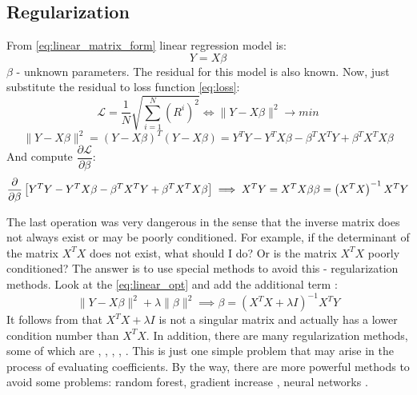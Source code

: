 \subsection{Regularization}
From \eqref{eq:linear_matrix_form} linear regression model is:
\begin{equation*}
	Y = X \beta
\end{equation*}
$\beta$ - unknown parameters. The residual for this model is also known. Now, just substitute the residual to loss function \eqref{eq:loss}:
\begin{equation*}
	\mathcal{L} = \dfrac{1}{N} \sqrt{\sum_{i = 1}^N \left ( R^i \right )^2} \Leftrightarrow \| Y - X \beta \|^2 \rightarrow min
\end{equation*}
\begin{equation}
	\| Y - X \beta \|^2 = \left ( Y - X \beta \right )^T \left ( Y - X \beta \right ) =  Y^T Y - Y^T X \beta - \beta^T X^T Y + \beta^T X^T X \beta
	\label{eq:linear_opt}
\end{equation}
And compute $\dfrac{\partial \mathcal{L}}{\partial \beta}$:
\begin{equation*}
	\dfrac{\partial }{\partial \beta} \left [ Y^T Y - Y^T X \beta - \beta^T X^T Y + \beta^T X^T X \beta \right ] \implies X^T Y =  X^T X \beta \\
	\beta = \left ( X^T X \right )^{-1} X^T Y
\end{equation*}

The last operation was very dangerous in the sense that the inverse matrix does not always exist or may be poorly conditioned. For example, if the determinant of the matrix $ X ^ T X $ does not exist, what should I do? Or is the matrix $X ^ T X$ poorly conditioned?
The answer is to use special methods to avoid this - regularization methods.
Look at the \eqref{eq:linear_opt} and add the additional term \cite{kress2012numerical}:
\begin{equation}
	\| Y - X \beta \|^2 + \lambda \| \beta \|^2 \implies \beta = \left ( X^T X + \lambda I \right )^{-1} X^T Y
\end{equation}
It follows from \cite{kress2012numerical} that $ X ^ T X + \lambda I $ is not a singular matrix and actually has a lower condition number than $ X ^ T X $. In addition, there are many regularization methods, some of which are \cite{ridge}, \cite{lasso}, \cite{dantzig_selector}, \cite{rlad}, \cite{slope}.
This is just one simple problem that may arise in the process of evaluating coefficients. By the way, there are more powerful methods to avoid some problems: random forest, gradient increase \cite{bishop}, neural networks \cite{haykin}.

